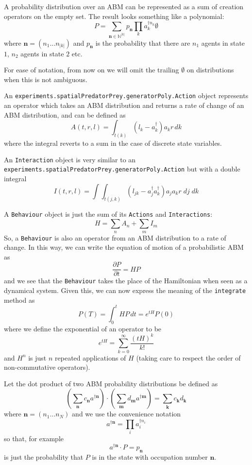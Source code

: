 \documentclass[letterpaper,twocolumn,10pt]{article}
\begin{document}
A probability distribution over an ABM can be represented as a sum of creation operators on the empty set. The result looks something like a polynomial:
\[
P = \sum_{\mathbf{n}\in \mathbb{N}^{|k|}} p_\mathbf{n} \prod_k a_k^{\dag n_k}\emptyset
\]
where $\mathbf{n} = (n_1...n_{|k|})$ and $p_\mathbf{n}$ is the probability that there are $n_1$ agents in state $1$, $n_2$ agents in state $2$ etc.

For ease of notation, from now on we will omit the trailing $\emptyset$ on distributions when this is not ambiguous.


An \texttt{experiments.spatialPredatorPrey.generatorPoly.Action} object represents an operator which takes an ABM distribution and returns a rate of change of an ABM distribution, and can be defined as
\[
A(t,r,l) = \int_{t(k)} (l_k - a_k^\dag)a_kr \,dk
\] 
where the integral reverts to a sum in the case of discrete state variables.

An \texttt{Interaction} object is very similar to an \texttt{experiments.spatialPredatorPrey.generatorPoly.Action} but with a double integral
\[
I(t,r,l) = \int \int_{t(j,k)} (l_{jk} - a_j^\dag a_k^\dag)a_j a_k r\;  dj\; dk
\] 

A \texttt{Behaviour} object is just the sum of its \texttt{Actions} and \texttt{Interactions}:
\[
H = \sum_n A_n + \sum_m I_m
\]
So, a \texttt{Behaviour} is also an operator from an ABM distribution to a rate of change. In this way, we can write the equation of motion of a probabilistic ABM as
\[
\frac{\partial P}{\partial t} = HP
\]
and we see that the \texttt{Behaviour} takes the place of the Hamiltonian when seen as a dynamical system. Given this, we can now express the meaning of the \texttt{integrate} method as
\begin{equation}
P(T) = \int_0^t HP \, dt = e^{tH}P(0)
\label{mastereq}
\end{equation}
where we define the exponential of an operator to be
\[
e^{tH} = \sum_{k=0}^\infty \frac{(tH)^k}{k!}
\]
and $H^n$ is just $n$ repeated applications of $H$ (taking care to respect the order of non-commutative operators).

Let the dot product of two ABM probability distributions be defined as
\[
\left(\sum_\mathbf{n} c_\mathbf{n} a^{\dag \mathbf{n}}\right) \cdot \left(\sum_\mathbf{m} d_\mathbf{m} a^{\dag \mathbf{m}}\right) = \sum_\mathbf{k} c_\mathbf{k}d_\mathbf{k}
\]
where $\mathbf{n} = (n_1...n_N)$ and we use the convenience notation
\[
a^{\dag \mathbf{n}} = \prod_i a_i^{\dag n_i}
\]
so that, for example
\[
a^{\dag \mathbf{n}} \cdot P = p_\mathbf{n}
\]
is just the probability that $P$ is in the state with occupation number $\mathbf{n}$.
\end{document}
